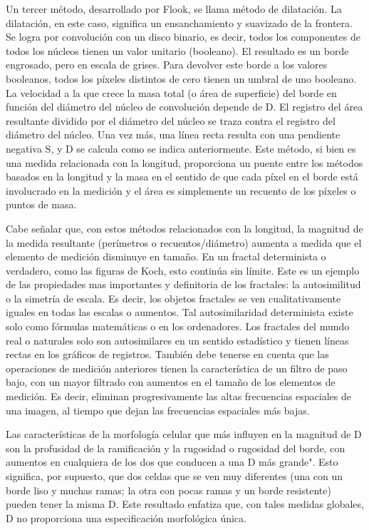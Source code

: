 \documentclass[11pt]{article}
\begin{document}
Un tercer método, desarrollado por Flook, se llama método de dilatación. La dilatación, en este caso, significa un ensanchamiento y suavizado de la frontera. Se logra por convolución con un disco binario, es decir, todos los componentes de todos los núcleos tienen un valor unitario (booleano). El resultado es un borde engrosado, pero en escala de grises. Para devolver este borde a los valores booleanos, todos los píxeles distintos de cero tienen un umbral de uno booleano. La velocidad a la que crece la masa total (o área de superficie) del borde en función del diámetro del núcleo de convolución depende de D. El registro del área resultante dividido por el diámetro del núcleo se traza contra el registro del diámetro del núcleo. Una vez más, una línea recta resulta con una pendiente negativa S, y D se calcula como se indica anteriormente. Este método, si bien es una medida relacionada con la longitud, proporciona un puente entre los métodos basados en la longitud y la masa en el sentido de que cada píxel en el borde está involucrado en la medición y el área es simplemente un recuento de los píxeles o puntos de masa.

Cabe señalar que, con estos métodos relacionados con la longitud, la magnitud de la medida resultante (perímetros o recuentos/diámetro) aumenta a medida que el elemento de medición disminuye en tamaño. En un fractal determinista o verdadero, como las figuras de Koch, esto continúa sin límite. Este es un ejemplo de las propiedades mas importantes y definitoria de los fractales: la autosimilitud o la simetría de escala. Es decir, los objetos fractales se ven cualitativamente iguales en todas las escalas o aumentos. Tal autosimilaridad determinista existe solo como fórmulas matemáticas o en los ordenadores. Los fractales del mundo real o naturales solo son autosimilares en un sentido estadístico y tienen líneas rectas en los gráficos de registros. También debe tenerse en cuenta que las operaciones de medición anteriores tienen la característica de un filtro de paso bajo, con un mayor filtrado con aumentos en el tamaño de los elementos de medición. Es decir, eliminan progresivamente las altas frecuencias espaciales de una imagen, al tiempo que dejan las frecuencias espaciales más bajas.




Las características de la morfología celular que más influyen en la magnitud de D son la profusidad de la ramificación y la rugosidad o rugosidad del borde, con aumentos en cualquiera de los dos que conducen a una D más grande". Esto significa, por supuesto, que dos celdas que se ven muy diferentes (una con un borde liso y muchas ramas; la otra con pocas ramas y un borde resistente) pueden tener la misma D. Este resultado enfatiza que, con tales medidas globales, D no proporciona una especificación morfológica única.
\end{document}
